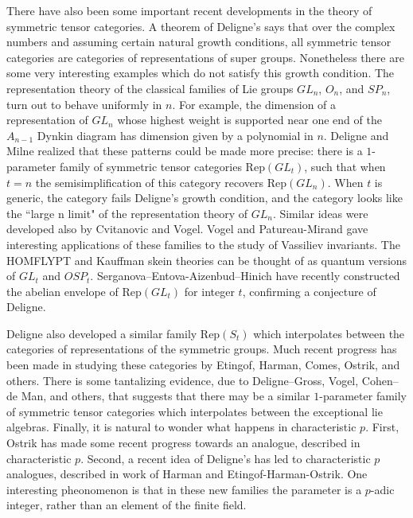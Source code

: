 \documentclass[12pt]{article}
\begin{document}
There have also been some important recent developments in the theory of symmetric tensor categories. A theorem of Deligne's says that over the complex numbers and assuming certain natural growth conditions, all symmetric tensor categories are categories of representations of super groups. Nonetheless there are some very interesting examples which do not satisfy this growth condition. The representation theory of the classical families of Lie groups $GL_n$, $O_n$, and $SP_n$, turn out to behave uniformly in $n$. For example, the dimension of a representation of $GL_n$ whose highest weight is supported near one end of the $A_{n-1}$ Dynkin diagram has dimension given by a polynomial in $n$. Deligne and Milne realized that these patterns could be made more precise: there is a $1$-parameter family of symmetric tensor categories $\mathrm{Rep}(GL_t)$, such that when $t=n$ the semisimplification of this category recovers $\mathrm{Rep}(GL_n)$. When $t$ is generic, the category fails Deligne's growth condition, and the category looks like the ``large n limit" of the representation theory of $GL_n$.  Similar ideas were developed also by Cvitanovic and Vogel. Vogel and Patureau-Mirand gave interesting applications of these families to the study of Vassiliev invariants.  The HOMFLYPT and Kauffman skein theories can be thought of as quantum versions of $GL_t$ and $OSP_t$. Serganova--Entova-Aizenbud--Hinich have recently constructed the abelian envelope of $\mathrm{Rep}(GL_t)$ for integer $t$, confirming a conjecture of Deligne.

Deligne also developed a similar family $\mathrm{Rep}(S_t)$ which interpolates between the categories of representations of the symmetric groups. Much recent progress has been made in studying these categories by Etingof, Harman, Comes, Ostrik, and others. There is some tantalizing evidence, due to Deligne--Gross, Vogel, Cohen--de Man, and others, that suggests that there may be a similar $1$-parameter family of symmetric tensor categories which interpolates between the exceptional lie algebras. Finally, it is natural to wonder what happens in characteristic $p$. First, Ostrik has made some recent progress towards an analogue, described in characteristic $p$.  Second, a recent idea of Deligne's has led to characteristic $p$ analogues, described in work of Harman and Etingof-Harman-Ostrik. One interesting pheonomenon is that in these new families the parameter is a $p$-adic integer, rather than an element of the finite field.
\end{document}
